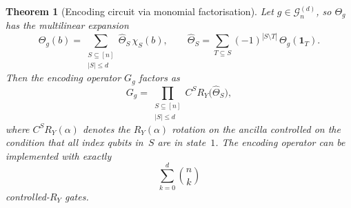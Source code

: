 \documentclass[12pt,a4paper]{article}
\theoremstyle{plain}
\newtheorem{theorem}{Theorem}[section]
\theoremstyle{definition}
\theoremstyle{remark}
\newcommand{\Ry}{R_Y}
\newcommand{\Gclass}[2]{\mathcal{G}_{#1}^{(#2)}}
\newcommand{\Thetag}{\Theta_g}
\newcommand{\wh}[2]{\hat{#1}_{#2}}
\newcommand{\chimon}[1]{\chi_{#1}}
\newcommand{\indvec}[1]{\mathbf{1}_{#1}}
\begin{document}
\begin{theorem}[Encoding circuit via monomial factorisation]
\label{thm:circuit_depth}
Let $g\in\Gclass{n}{d}$, so $\Thetag$ has the multilinear expansion
\begin{equation}
  \Thetag(b)
  = \sum_{\substack{S\subseteq[n]\\ |S|\leq d}}
    \wh{\Theta}{S}\,\chimon{S}(b),
  \qquad
  \wh{\Theta}{S}
  = \sum_{T\subseteq S}(-1)^{|S\setminus T|}\,\Thetag(\indvec{T}).
  \label{eq:theta_expansion}
\end{equation}
Then the encoding operator $G_g$ factors as
\begin{equation}
  G_g
  = \prod_{\substack{S\subseteq[n]\\ |S|\leq d}}
    C^S\Ry\!\bigl(\wh{\Theta}{S}\bigr),
  \label{eq:G_factorization}
\end{equation}
where $C^S\Ry(\alpha)$ denotes the $\Ry(\alpha)$ rotation on the ancilla
controlled on the condition that all index qubits in~$S$ are in state~$1$.
The encoding operator can be implemented with exactly
\begin{equation}
  \sum_{k=0}^{d}\binom{n}{k}
  \label{eq:gate_count}
\end{equation}
controlled-$\Ry$ gates.
\end{theorem}
\end{document}
